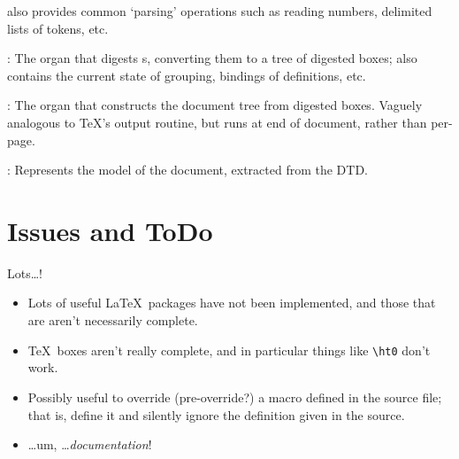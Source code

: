 \documentclass{article}
\newcommand{\LTXToken}{\pkg{LaTeXML::Token}}
\newcommand{\LTXStomach}{\pkg{LaTeXML::Stomach}}
\newcommand{\LTXIntestine}{\pkg{LaTeXML::Intestine}}
\newcommand{\LTXModel}{\pkg{LaTeXML::Model}}
\begin{document}
\begin{description}
\begin{description}
      also provides common `parsing' operations such as reading numbers, delimited lists of tokens, etc.
    \item[\LTXStomach]: The organ that digests \LTXToken s, converting them to a tree of
       digested boxes; also contains the current state of grouping, bindings of definitions, etc.
    \item[\LTXIntestine]: The organ that constructs the document tree from digested boxes.
       Vaguely analogous to \TeX's output routine, but runs at end of document, rather than per-page.
    \item[\LTXModel]: Represents the model of the document, extracted from the DTD.
  \end{description}
\end{description}

\section{Issues and ToDo}\label{app:todo}
Lots\ldots!
\begin{itemize}
\item Lots of useful \LaTeX\ packages have not been implemented, and those
  that are aren't necessarily complete.
\item \TeX\ boxes aren't really complete, and in particular things like \verb|\ht0|
  don't work.
\item Possibly useful to override (pre-override?) a macro defined in the source file;
  that is, define it and silently ignore the definition given in the source.
\item \ldots um, \ldots \emph{documentation}!
\end{itemize}
\end{document}
